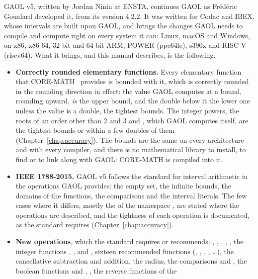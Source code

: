 \medskip
GAOL v5, written by Jordan Ninin at ENSTA, continues GAOL as Fr\'ed\'eric
Goualard developed it, from its version 4.2.2. It was written for Codac and
IBEX, whose intervals are built upon GAOL, and brings the changes GAOL needs to
compile and compute right on every system it can: Linux, macOS and Windows,
on x86, x86-64, 32-bit and 64-bit ARM, POWER (ppc64le), s390x and RISC-V
(riscv64).
%
What it brings, and this manual describes, is the following.

\begin{itemize}
\item[$\bullet$] \textbf{Correctly rounded elementary functions.} Every
  elementary function that CORE-MATH~\cite{CoreMath:2022} provides is bounded
  with it, which is correctly rounded in the rounding direction in effect: the
  value GAOL computes at a bound, rounding upward, \emph{is} the upper bound,
  and the double below it the lower one unless the value is a double, the tightest
  bounds. The integer
  powers, the roots of an order other than 2 and 3 and , which GAOL computes itself, are the
  tightest bounds or within a few doubles of them
  (Chapter~\ref{chap:accuracy}). The bounds are the same on every architecture
  and with every compiler, and there is no mathematical library to install, to
  find or to link along with GAOL: CORE-MATH is compiled into it.
\item[$\bullet$] \textbf{IEEE 1788-2015.} GAOL v5 follows the standard for
  interval arithmetic in the operations GAOL provides: the empty set, the
  infinite bounds, the domains of the functions, the comparisons and the
  interval literals. The few cases where it differs, mostly the 
  of the namespace , are stated where the operations are
  described, and the tightness of each operation is documented, as the
  standard requires (Chapter~\ref{chap:accuracy}).
\item[$\bullet$] \textbf{New operations}, which the standard requires or
  recommends: , , , ,
  , the integer functions , ,
   and , sixteen
  recommended functions (, , ,
  , \ldots), the cancellative subtraction and
  addition, the radius, the comparisons  and
  , the boolean functions  and
  , , the reverse functions of the

\end{itemize}
